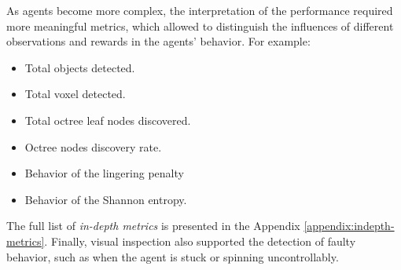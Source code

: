 As agents become more complex, the interpretation of the performance required more meaningful metrics, which allowed to distinguish the influences of different observations and rewards in the agents' behavior. For example:
\begin{multicols}{2}
    \begin{itemize}
        \item Total objects detected.
        \item Total voxel detected.
        \item Total octree leaf nodes discovered.
        \item Octree nodes discovery rate.
        \item Behavior of the lingering penalty
        \item Behavior of the Shannon entropy.
    \end{itemize}
\end{multicols}
The full list of \textit{in-depth metrics} is presented in the Appendix \ref{appendix:indepth-metrics}. Finally, visual inspection also supported the detection of faulty behavior, such as when the agent is stuck or spinning uncontrollably.






